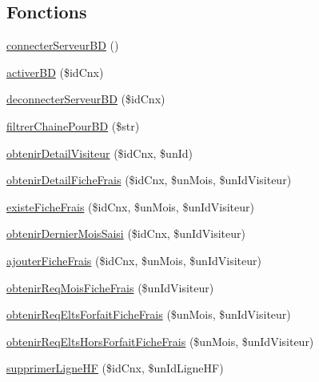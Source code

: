 \subsection*{Fonctions}
\begin{DoxyCompactItemize}
\item 
\hyperlink{__bd_gestion_donnees_8lib_8php_a3e03d598e990acf42577600cfe37f114}{connecter\-Serveur\-B\-D} ()
\item 
\hyperlink{__bd_gestion_donnees_8lib_8php_a2a30766b0cf73bf7a75b6a14756924db}{activer\-B\-D} (\$id\-Cnx)
\item 
\hyperlink{__bd_gestion_donnees_8lib_8php_aa443bd4a88ea69ec0e39ef82efd79f06}{deconnecter\-Serveur\-B\-D} (\$id\-Cnx)
\item 
\hyperlink{__bd_gestion_donnees_8lib_8php_af2cca7a3ba7b15f9cedf99333367e598}{filtrer\-Chaine\-Pour\-B\-D} (\$str)
\item 
\hyperlink{__bd_gestion_donnees_8lib_8php_a3d9b6723fcf62f7ccd5658e6b9485977}{obtenir\-Detail\-Visiteur} (\$id\-Cnx, \$un\-Id)
\item 
\hyperlink{__bd_gestion_donnees_8lib_8php_a6119c74cdb5769c2a42bc14232cfc235}{obtenir\-Detail\-Fiche\-Frais} (\$id\-Cnx, \$un\-Mois, \$un\-Id\-Visiteur)
\item 
\hyperlink{__bd_gestion_donnees_8lib_8php_a0e6e5b420aed0486b7a9af7975739787}{existe\-Fiche\-Frais} (\$id\-Cnx, \$un\-Mois, \$un\-Id\-Visiteur)
\item 
\hyperlink{__bd_gestion_donnees_8lib_8php_a43c72282ff5396e3b67cc87753da4383}{obtenir\-Dernier\-Mois\-Saisi} (\$id\-Cnx, \$un\-Id\-Visiteur)
\item 
\hyperlink{__bd_gestion_donnees_8lib_8php_a493124b80e53529be81247852b149f96}{ajouter\-Fiche\-Frais} (\$id\-Cnx, \$un\-Mois, \$un\-Id\-Visiteur)
\item 
\hyperlink{__bd_gestion_donnees_8lib_8php_af7ab441030c5c590de0b463414880a16}{obtenir\-Req\-Mois\-Fiche\-Frais} (\$un\-Id\-Visiteur)
\item 
\hyperlink{__bd_gestion_donnees_8lib_8php_a8a9e576b89da1f4174e8730e2a66873b}{obtenir\-Req\-Elts\-Forfait\-Fiche\-Frais} (\$un\-Mois, \$un\-Id\-Visiteur)
\item 
\hyperlink{__bd_gestion_donnees_8lib_8php_a0c288b49f3dac1ab111e800f2794aac4}{obtenir\-Req\-Elts\-Hors\-Forfait\-Fiche\-Frais} (\$un\-Mois, \$un\-Id\-Visiteur)
\item 
\hyperlink{__bd_gestion_donnees_8lib_8php_aa1a490dbef0da5c098e871f4091b910f}{supprimer\-Ligne\-H\-F} (\$id\-Cnx, \$un\-Id\-Ligne\-H\-F)
\item 

\end{DoxyCompactItemize}
